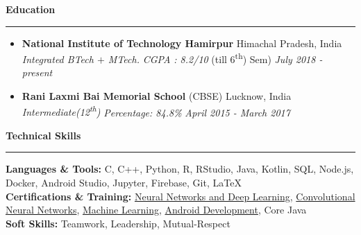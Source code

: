 \documentclass[11pt]{article}
\begin{document}
    \vspace{2pt}
    \textbf{\large{Education}}
    	\vspace{5pt}
    	\hrule
    	\vspace{-4pt}
    	\begin{itemize}
    		\setlength{\itemsep}{4pt}
        	\setlength{\parskip}{0pt}
        	\setlength{\parsep}{4pt}
        	\item \textbf{National Institute of Technology Hamirpur} \hfill Himachal Pradesh, India\\
        	\textsl{Integrated BTech $+$ MTech.} \textit{CGPA : 8.2/10}  (till 6\textsuperscript{th}) Sem)
        	\hfill 
        	\textit{July 2018 - present}
        	\item \textbf{Rani Laxmi Bai Memorial School} (CBSE) \hfill Lucknow, India\\
        	\textsl{Intermediate(12\textsuperscript{th}) } \textit{Percentage: 84.8\%}  \hfill 
        	\textit{April 2015 - March 2017}
    	\end{itemize}
    \vspace{2pt}
    \textbf{Technical Skills}
    	\vspace{5pt}
    	\hrule
    	\vspace{4pt}
    	\textbf{Languages \& Tools:} C, C++, Python, R, RStudio, Java, Kotlin, SQL, Node.js, Docker, Android Studio, Jupyter, Firebase, Git, \LaTeX\\
        \textbf{Certifications \& Training:} \href{https://drive.google.com/file/d/1mir_TBy9GinXpSU3H-8LyYn68GkcM62f/view?usp=sharing}{Neural Networks and Deep Learning}, \href{https://drive.google.com/file/d/18cQMPfNLtvY4-Ozh7hZnUIDKYh9tRYPG/view?usp=sharing}{Convolutional Neural Networks}, \href{https://drive.google.com/file/d/13L4JKQ1pwLG9YVevPVZLNRLUeZWGkvyU/view?usp=sharing}{Machine Learning}, \href{https://drive.google.com/file/d/1Hp5dvhNVz9FvjQ6Y4vIVZldKpb8m8LCp/view?usp=sharing}{Android Development}, Core Java\\
        \textbf{Soft Skills:} Teamwork, Leadership, Mutual-Respect\\
   
\end{document}
